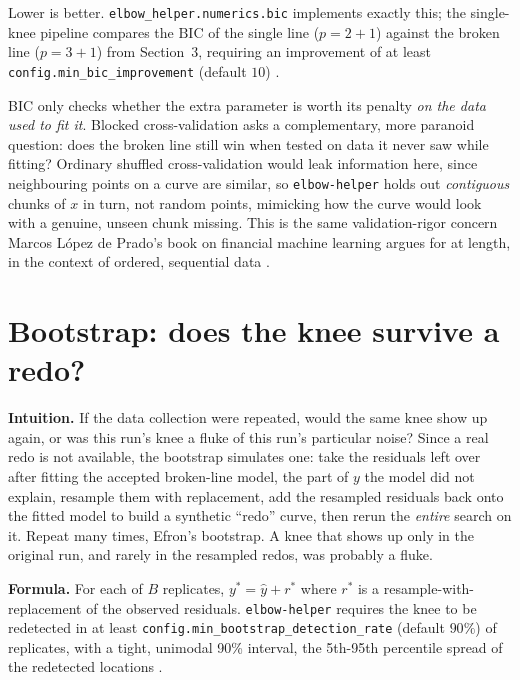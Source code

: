 \documentclass[11pt]{article}
\newcommand{\code}[1]{\texttt{#1}}
\begin{document}
Lower is better. \code{elbow\_helper.numerics.bic} implements exactly
this; the single-knee pipeline compares the $\mathrm{BIC}$ of the single
line ($p = 2 + 1$) against the broken line ($p = 3 + 1$) from Section~3,
requiring an improvement of at least \code{config.min\_bic\_improvement}
(default $10$) \citep{schwarz1978} \citep{hastie2009esl} \citep{bishop2006prml}.

BIC only checks whether the extra parameter is worth its penalty \emph{on
the data used to fit it}. Blocked cross-validation asks a complementary,
more paranoid question: does the broken line still win when tested on data
it never saw while fitting? Ordinary shuffled cross-validation would leak
information here, since neighbouring points on a curve are similar, so
\code{elbow-helper} holds out \emph{contiguous} chunks of $x$ in turn, not
random points, mimicking how the curve would look with a genuine, unseen
chunk missing. This is the same validation-rigor concern Marcos L\'opez de
Prado's book on financial machine learning argues for at length, in the
context of ordered, sequential data \citeyearpar{lopezdeprado2018financial}.

\section{Bootstrap: does the knee survive a redo?}

\textbf{Intuition.} If the data collection were repeated, would the same
knee show up again, or was this run's knee a fluke of this run's
particular noise? Since a real redo is not available, the bootstrap
simulates one: take the residuals left over after fitting the accepted
broken-line model, the part of $y$ the model did not explain, resample them
with replacement, add the resampled residuals back onto the fitted model to
build a synthetic ``redo'' curve, then rerun the \emph{entire} search on
it. Repeat many times, Efron's bootstrap. A knee that shows up only in the
original run, and rarely in the resampled redos, was probably a fluke.

\textbf{Formula.} For each of $B$ replicates, $y^\ast = \hat y + r^\ast$
where $r^\ast$ is a resample-with-replacement of the observed residuals.
\code{elbow-helper} requires the knee to be redetected in at least
\code{config.min\_bootstrap\_detection\_rate} (default $90\%$) of
replicates, with a tight, unimodal 90\% interval, the 5th-95th percentile
spread of the redetected locations \citep{efron1979} \citep{hastie2009esl}.
\end{document}
